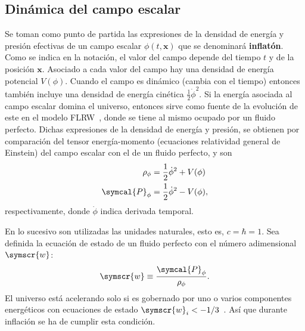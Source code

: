 \subsection{Dinámica del campo escalar}
Se toman como punto de partida las expresiones de la densidad de energía y presión efectivas de un campo escalar \(\phi\left(t,\symbf{x}\right)\) que se denominará \textbf{inflatón}. Como se indica en la notación, el valor del campo depende del tiempo \(t\) y de la posición \(\symbf{x}\). Asociado a cada valor del campo hay una densidad de energía potencial \(V(\phi)\). Cuando el campo es dinámico (cambia con el tiempo) entonces también incluye una densidad de energía cinética \(\frac{1}{2}\dot{\phi}^2\). Si la energía asociada al campo escalar domina el universo, entonces sirve como fuente de la evolución de este en el modelo FLRW~\cite{baumann2022cosmology}, donde se tiene al mismo ocupado por un fluido perfecto. Dichas expresiones de la densidad de energía y presión, se obtienen por comparación del tensor energía-momento (ecuaciones relatividad general de Einstein) del campo escalar con el de un fluido perfecto, y son
\begin{subequations}
    \begin{align}
        \rho_\phi       & =\frac{1}{2}\dot{\phi}^2+V(\phi)\label{eq::rho} \\
        \symcal{P}_\phi & =\frac{1}{2}\dot{\phi}^2-V(\phi),
    \end{align}
    \label{eq::eqscampo}
\end{subequations}
respectivamente, donde \(\dot{\phi}\) indica derivada temporal.

En lo sucesivo son utilizadas las unidades naturales, esto es, \(c=\hbar=1\). Sea definida la ecuación de estado de un fluido perfecto con el número adimensional \(\symscr{w}\):
\begin{equation}
    \symscr{w}\equiv\frac{\symcal{P}_\phi}{\rho_\phi}.
\end{equation}
El universo está acelerando solo si es gobernado por uno o varios componentes energéticos con ecuaciones de estado \(\symscr{w}_i<-1/3\)~\cite{knobel2012introduction}. Así que durante inflación se ha de cumplir esta condición.

